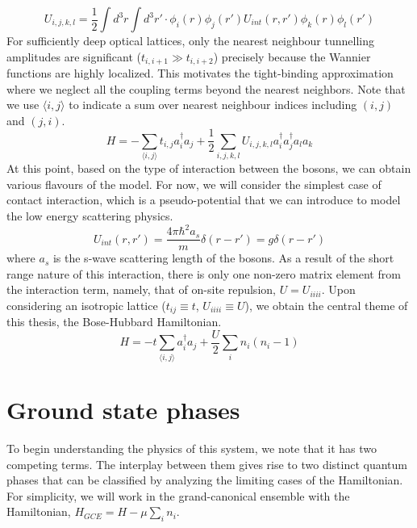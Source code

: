 \begin{equation}\label{eq:interact_param}
    U_{i, j, k, l} = \frac{1}{2}\int d^3r\int d^3r' \cdot \phi_i(r)\phi_j(r') U_{int}(r, r')\phi_k(r)\phi_l(r')    
\end{equation}
For sufficiently deep optical lattices, only the nearest neighbour tunnelling amplitudes are significant ($t_{i, i+1} \gg t_{i, i+2}$) precisely because the Wannier functions are highly localized. This motivates the tight-binding approximation where we neglect all the coupling terms beyond the nearest neighbors. Note that we use $\langle i, j\rangle$ to indicate a sum over nearest neighbour indices including $(i, j)$ and $(j, i)$.
\begin{equation}
    H = -\sum_{\langle i, j \rangle}t_{i, j} a_i^{\dagger}a_j + \frac{1}{2}\sum_{i, j, k, l} U_{i, j, k, l} a_i^{\dagger} a_j^{\dagger}a_l a_k
\end{equation}
At this point, based on the type of interaction between the bosons, we can obtain various flavours of the model\cite{Dutta_2015}. For now, we will consider the simplest case of contact interaction, which is a pseudo-potential that we can introduce to model the low energy scattering physics\cite{reichl}.
\begin{equation}
    U_{int}(r,r') = \frac{4\pi\hbar^2 a_s}{m} \delta(r - r') = g\delta(r - r')
\end{equation}
where $a_s$ is the s-wave scattering length of the bosons. As a result of the short range nature of this interaction, there is only one non-zero matrix element from the interaction term, namely, that of on-site repulsion, $U = U_{iiii}$. Upon considering an isotropic lattice ($t_{i j} \equiv t$, $U_{iiii} \equiv U$), we obtain the central theme of this thesis, the Bose-Hubbard Hamiltonian.
\begin{equation}\label{eq:bhm}
    H = -t\sum_{\langle i, j \rangle} a_i^{\dagger}a_j + \frac{U}{2}\sum_{i} n_i(n_i - 1)    
\end{equation}
\section{Ground state phases}
To begin understanding the physics of this system, we note that it has two competing terms. The interplay between them gives rise to two distinct quantum phases that can be classified by analyzing the limiting cases of the Hamiltonian. For simplicity, we will work in the grand-canonical ensemble with the Hamiltonian, $H_{GCE} = H-\mu\sum_i n_i$.

